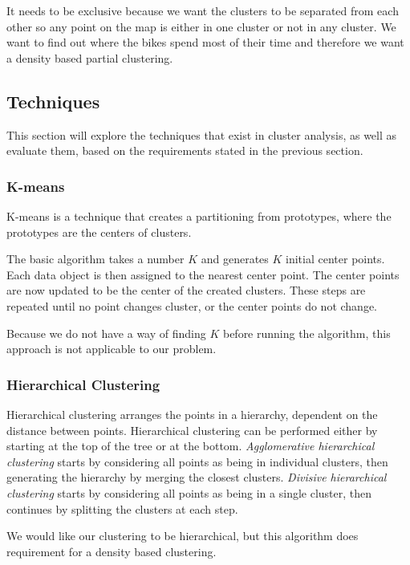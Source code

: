 It needs to be exclusive because we want the clusters to be separated from each other so any point on the map is either in one cluster or not in any cluster.
We want to find out where the bikes spend most of their time and therefore we want a density based partial clustering.

\subsection{Techniques}
This section will explore the techniques that exist in cluster analysis, as well as evaluate them, based on the requirements stated in the previous section.

\subsubsection{K-means}
K-means is a technique that creates a partitioning from prototypes, where the prototypes are the centers of clusters.

The basic algorithm takes a number $K$ and generates $K$ initial center points.
Each data object is then assigned to the nearest center point.
The center points are now updated to be the center of the created clusters.
These steps are repeated until no point changes cluster, or the center points do not change.

Because we do not have a way of finding $K$ before running the algorithm, this approach is not applicable to our problem.

\subsubsection{Hierarchical Clustering}
Hierarchical clustering arranges the points in a hierarchy, dependent on the distance between points.
Hierarchical clustering can be performed either by starting at the top of the tree or at the bottom.
\textit{Agglomerative hierarchical clustering} starts by considering all points as being in individual clusters, then generating the hierarchy by merging the closest clusters.
\textit{Divisive hierarchical clustering} starts by considering all points as being in a single cluster, then continues by splitting the clusters at each step.

We would like our clustering to be hierarchical, but this algorithm does requirement for a density based clustering.

